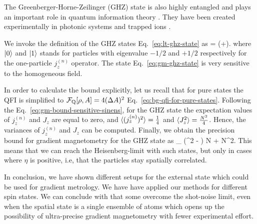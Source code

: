 
The Greenberger-Horne-Zeilinger (GHZ) state is also highly entangled and plays an important role in quantum information theory \cite{Greenberger1990}.
They have been created experimentally in photonic systems \cite{Pan2000,Yao2012,Lu2007} and trapped ions \cite{Sackett2000,Monz2011}.

We invoke the definition of the GHZ states Eq.~\eqref{eq:lt-ghz-state} as
\be
  \ket{\ghz} = (+).
  \label{eq:gm-ghz-state}
\ee
where $\vert{0}\rangle$ and $\vert{1}\rangle$ stands for particles with eigenvalue $-1/2$ and $+1/2$ respectively for the one-particle $j_z^{(n)}$ operator.
The state Eq.~\eqref{eq:gm-ghz-state} is very sensitive to the homogeneous field.

In order to calculate the bound explicitly, let us recall that for pure states the QFI is simplified to $\mathcal{F}_{\textnormal{Q}}[{\textstyle \rho,A}]=4(\Delta A )^2$ Eq.~\eqref{eq:bg-qfi-for-pure-states}.
Following the Eq.~\eqref{eq:gm-bound-sensitive-sinens}, for the GHZ state the expectation values of $j_z^{(n)}$ and $J_z$ are equal to zero, and $\langle{(j_z^{(n)})^2}\rangle=\frac{1}{4}$ and $\langle{J_z^2}\rangle = \frac{N^2}{4}$.
Hence, the variances of $j_z^{(n)}$ and $J_z$ can be computed.
Finally, we obtain the precision bound for gradient magnetometry for the GHZ state as
\be
\label{eq:gm-precision bound for ghz}
_{\ghz} \leqslant (\sigma^2 - \eta) N  + \eta N^2.
\ee
This means that we can reach the Heisenberg-limit with such states, but only in
cases where $\eta$ is positive, i.e, that the particles stay spatially correlated.

In conclusion, we have shown different setups for the external state which could be used for gradient metrology.
We have have applied our methods for different spin states.
We can conclude with that some overcome the shot-noise limit, even when the spatial state is a single ensemble of atoms which opens up the possibility of ultra-precise gradient magnetometry with fewer experimental effort.
